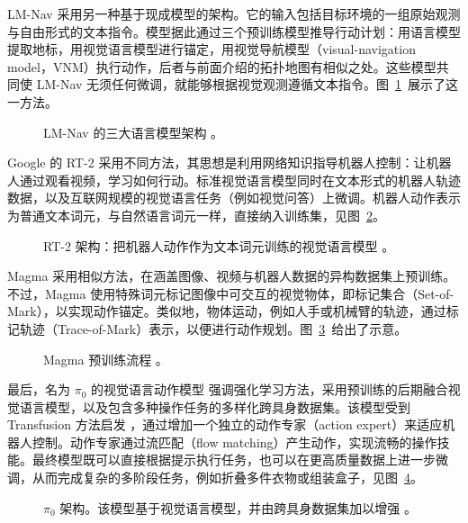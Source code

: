 LM-Nav \citep{shah2023lm} 采用另一种基于现成模型的架构。它的输入包括目标环境的一组原始观测与自由形式的文本指令。模型据此通过三个预训练模型推导行动计划：用语言模型提取地标，用视觉语言模型进行锚定，用视觉导航模型（visual-navigation model，VNM）执行动作，后者与前面介绍的拓扑地图有相似之处。这些模型共同使 LM-Nav 无须任何微调，就能够根据视觉观测遵循文本指令。图~\ref{fig:lmnav}~展示了这一方法。
\begin{figure}
    \centering
    
    \caption{LM-Nav 的三大语言模型架构 \citep{shah2023lm}。}
    \label{fig:lmnav}
\end{figure}

Google 的 RT-2 \citep{brohan2023rt} 采用不同方法，其思想是利用网络知识指导机器人控制：让机器人通过观看视频，学习如何行动。标准视觉语言模型同时在文本形式的机器人轨迹数据，以及互联网规模的视觉语言任务（例如视觉问答）上微调。机器人动作表示为普通文本词元，与自然语言词元一样，直接纳入训练集，见图~\ref{fig:rt2}。
\begin{figure}
    \centering
    
    \caption{RT-2 架构：把机器人动作作为文本词元训练的视觉语言模型 \citep{brohan2023rt}。}
    \label{fig:rt2}
\end{figure}
Magma \citep{yang2025magma} 采用相似方法，在涵盖图像、视频与机器人数据的异构数据集上预训练。不过，Magma 使用特殊词元标记图像中可交互的视觉物体，即标记集合（Set-of-Mark），以实现动作锚定。类似地，物体运动，例如人手或机械臂的轨迹，通过标记轨迹（Trace-of-Mark）表示，以便进行动作规划。图~\ref{fig:magma}~给出了示意。
\begin{figure}
    \centering
    
    \caption{Magma 预训练流程 \citep{yang2025magma}。}
    \label{fig:magma}
\end{figure}

最后，名为 $\pi_0$ 的视觉语言动作模型 \citep{black2024pi_0} 强调强化学习方法，采用预训练的后期融合视觉语言模型，以及包含多种操作任务的多样化跨具身数据集。该模型受到 Transfusion 方法启发 \citep{zhou2024transfusion}，通过增加一个独立的动作专家（action expert）来适应机器人控制。动作专家通过流匹配（flow matching）产生动作，实现流畅的操作技能。最终模型既可以直接根据提示执行任务，也可以在更高质量数据上进一步微调，从而完成复杂的多阶段任务，例如折叠多件衣物或组装盒子，见图~\ref{fig:pizero}。
\begin{figure}
    \centering
    
    \caption{$\pi_0$ 架构。该模型基于视觉语言模型，并由跨具身数据集加以增强 \citep{black2024pi_0}。}
    \label{fig:pizero}
\end{figure}

